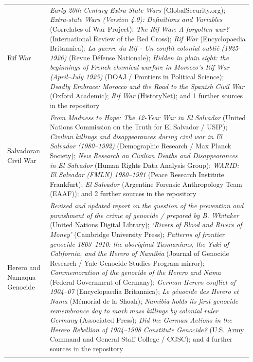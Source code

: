 \documentclass[11pt]{article}
\begin{document}
\begin{scriptsize}
\begin{longtable}{p{3.5cm} p{12.5cm}}
Rif War & \emph{Early 20th Century Extra-State Wars} (GlobalSecurity.org); \emph{Extra-state Wars (Version 4.0): Definitions and Variables} (Correlates of War Project); \emph{The Rif War: A forgotten war?} (International Review of the Red Cross); \emph{Rif War} (Encyclopaedia Britannica); \emph{La guerre du Rif - Un conflit colonial oublié (1925-1926)} (Revue Défense Nationale); \emph{Hidden in plain sight: the beginnings of French chemical warfare in Morocco’s Rif War (April–July 1925)} (DOAJ / Frontiers in Political Science); \emph{Deadly Embrace: Morocco and the Road to the Spanish Civil War} (Oxford Academic); \emph{Rif War} (HistoryNet); and 1 further sources in the repository \\
\addlinespace
Salvadoran Civil War & \emph{From Madness to Hope: The 12-Year War in El Salvador} (United Nations Commission on the Truth for El Salvador / USIP); \emph{Civilian killings and disappearances during civil war in El Salvador (1980–1992)} (Demographic Research / Max Planck Society); \emph{New Research on Civilian Deaths and Disappearances in El Salvador} (Human Rights Data Analysis Group); \emph{WARID: El Salvador (FMLN) 1980–1991} (Peace Research Institute Frankfurt); \emph{El Salvador} (Argentine Forensic Anthropology Team (EAAF)); and 2 further sources in the repository \\
\addlinespace
Herero and Namaqua Genocide & \emph{Revised and updated report on the question of the prevention and punishment of the crime of genocide / prepared by B. Whitaker} (United Nations Digital Library); \emph{‘Rivers of Blood and Rivers of Money’} (Cambridge University Press); \emph{Patterns of frontier genocide 1803–1910: the aboriginal Tasmanians, the Yuki of California, and the Herero of Namibia} (Journal of Genocide Research / Yale Genocide Studies Program mirror); \emph{Commemoration of the genocide of the Herero and Nama} (Federal Government of Germany); \emph{German-Herero conflict of 1904–07} (Encyclopaedia Britannica); \emph{Le génocide des Herero et Nama} (Mémorial de la Shoah); \emph{Namibia holds its first genocide remembrance day to mark mass killings by colonial ruler Germany} (Associated Press); \emph{Did the German Actions in the Herero Rebellion of 1904–1908 Constitute Genocide?} (U.S. Army Command and General Staff College / CGSC); and 4 further sources in the repository \\
\addlinespace

\end{longtable}
\end{scriptsize}
\end{document}
